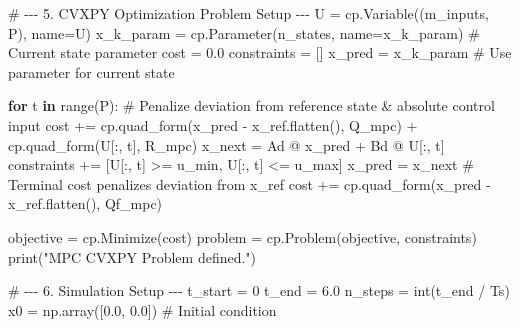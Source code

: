 \documentclass[
  letterpaper,
  DIV=11,
  numbers=noendperiod,
  oneside]{scrartcl}
\newenvironment{Shaded}{\begin{snugshade}}{\end{snugshade}}
\newcommand{\BuiltInTok}[1]{\textcolor[rgb]{0.00,0.23,0.31}{#1}}
\newcommand{\CommentTok}[1]{\textcolor[rgb]{0.37,0.37,0.37}{#1}}
\newcommand{\ControlFlowTok}[1]{\textcolor[rgb]{0.00,0.23,0.31}{\textbf{#1}}}
\newcommand{\DecValTok}[1]{\textcolor[rgb]{0.68,0.00,0.00}{#1}}
\newcommand{\FloatTok}[1]{\textcolor[rgb]{0.68,0.00,0.00}{#1}}
\newcommand{\KeywordTok}[1]{\textcolor[rgb]{0.00,0.23,0.31}{\textbf{#1}}}
\newcommand{\NormalTok}[1]{\textcolor[rgb]{0.00,0.23,0.31}{#1}}
\newcommand{\OperatorTok}[1]{\textcolor[rgb]{0.37,0.37,0.37}{#1}}
\newcommand{\StringTok}[1]{\textcolor[rgb]{0.13,0.47,0.30}{#1}}
\begin{document}
\begin{Shaded}
\begin{Highlighting}[numbers=left,,]
\CommentTok{\# {-}{-}{-} 5. CVXPY Optimization Problem Setup {-}{-}{-}}
\NormalTok{U }\OperatorTok{=}\NormalTok{ cp.Variable((m\_inputs, P), name}\OperatorTok{=}\StringTok{\textquotesingle{}U\textquotesingle{}}\NormalTok{)}
\NormalTok{x\_k\_param }\OperatorTok{=}\NormalTok{ cp.Parameter(n\_states, name}\OperatorTok{=}\StringTok{\textquotesingle{}x\_k\_param\textquotesingle{}}\NormalTok{) }\CommentTok{\# Current state parameter}
\NormalTok{cost }\OperatorTok{=} \FloatTok{0.0}
\NormalTok{constraints }\OperatorTok{=}\NormalTok{ []}
\NormalTok{x\_pred }\OperatorTok{=}\NormalTok{ x\_k\_param }\CommentTok{\# Use parameter for current state}

\ControlFlowTok{for}\NormalTok{ t }\KeywordTok{in} \BuiltInTok{range}\NormalTok{(P):}
    \CommentTok{\# Penalize deviation from reference state \& absolute control input}
\NormalTok{    cost }\OperatorTok{+=}\NormalTok{ cp.quad\_form(x\_pred }\OperatorTok{{-}}\NormalTok{ x\_ref.flatten(), Q\_mpc) }\OperatorTok{+}\NormalTok{ cp.quad\_form(U[:, t], R\_mpc)}
\NormalTok{    x\_next }\OperatorTok{=}\NormalTok{ Ad }\OperatorTok{@}\NormalTok{ x\_pred }\OperatorTok{+}\NormalTok{ Bd }\OperatorTok{@}\NormalTok{ U[:, t]}
\NormalTok{    constraints }\OperatorTok{+=}\NormalTok{ [U[:, t] }\OperatorTok{\textgreater{}=}\NormalTok{ u\_min, U[:, t] }\OperatorTok{\textless{}=}\NormalTok{ u\_max]}
\NormalTok{    x\_pred }\OperatorTok{=}\NormalTok{ x\_next}
\CommentTok{\# Terminal cost penalizes deviation from x\_ref}
\NormalTok{cost }\OperatorTok{+=}\NormalTok{ cp.quad\_form(x\_pred }\OperatorTok{{-}}\NormalTok{ x\_ref.flatten(), Qf\_mpc)}

\NormalTok{objective }\OperatorTok{=}\NormalTok{ cp.Minimize(cost)}
\NormalTok{problem }\OperatorTok{=}\NormalTok{ cp.Problem(objective, constraints)}
\BuiltInTok{print}\NormalTok{(}\StringTok{"MPC CVXPY Problem defined."}\NormalTok{)}

\CommentTok{\# {-}{-}{-} 6. Simulation Setup {-}{-}{-}}
\NormalTok{t\_start }\OperatorTok{=} \DecValTok{0}
\NormalTok{t\_end }\OperatorTok{=} \FloatTok{6.0}
\NormalTok{n\_steps }\OperatorTok{=} \BuiltInTok{int}\NormalTok{(t\_end }\OperatorTok{/}\NormalTok{ Ts)}
\NormalTok{x0 }\OperatorTok{=}\NormalTok{ np.array([}\FloatTok{0.0}\NormalTok{, }\FloatTok{0.0}\NormalTok{]) }\CommentTok{\# Initial condition}


\end{Highlighting}
\end{Shaded}
\end{document}
